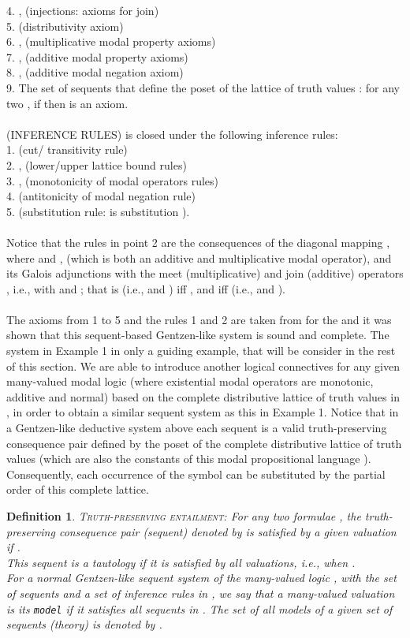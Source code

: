 \documentclass[10pt,twocolumn]{article}
\newtheorem{definition}{Definition}
\begin{document}
 4. ,  (injections: axioms
 for join)\\
 5. 
 (distributivity axiom)\\
 6. ,  (multiplicative modal property axioms)\\
 7.  ,  (additive modal property axioms)\\
 8. , 
 (additive modal negation axiom)\\
  9. The set of sequents that define the poset of the lattice of
 truth values : for any two , if 
 then  is an axiom.\\\\
 (INFERENCE RULES)  is closed under the following inference
 rules:\\
 1.  (cut/
 transitivity rule)\\
 2. ,  (lower/upper lattice bound rules)\\
 3. ,  (monotonicity of
 modal operators rules)\\
 4.  (antitonicity of
 modal negation rule)\\
 5.  (substitution
 rule:  is substitution ).\\\\
 Notice that the rules in point 2 are the consequences of the diagonal mapping , where  and ,
  (which is both an additive and multiplicative modal operator), and its Galois
 adjunctions with the meet (multiplicative) and join (additive) operators , i.e., with  and ; that is  (i.e.,  and ) iff ,
 and  iff  (i.e.,  and ).
 \\ \\
 The axioms from 1 to 5 and the rules  1 and 2 are
 taken from \cite{Dunn95} for the  and it was shown that this sequent-based Gentzen-like system is sound and
 complete. The system  in Example 1 in only a guiding example, that will be consider in the rest of this section. We are able  to introduce another logical
 connectives for any given many-valued modal logic (where existential modal operators are monotonic, additive and normal) based on the
 complete distributive  lattice of truth values in , in order to obtain a
 similar sequent system as this in Example 1.
Notice that  in a  Gentzen-like deductive system  above each
 sequent is a valid truth-preserving consequence pair defined by the poset
 of the complete distributive lattice  of truth values (which are also the
 constants of this modal propositional language ). Consequently, each
 occurrence of the symbol  can be substituted by the partial
 order  of this complete lattice.
 \begin{definition} \textsc{Truth-preserving entailment:}
 \label{def:entailment} For any two formulae ,
 the truth-preserving consequence pair (sequent) denoted by
  is satisfied by a given valuation  if .\\
  This sequent is a
 tautology if it is satisfied by all valuations, i.e., when
 .\\
 For a  normal Gentzen-like sequent system  of the many-valued logic , with the set of sequents  and a set of inference rules in , we say that a many-valued valuation  is its \verb"model"
  if it satisfies all sequents in . The set of all models of
  a given set of sequents (theory)  is denoted by
  .
 \end{definition}
\end{document}
